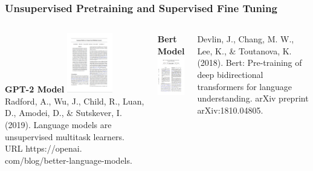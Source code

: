
\begin{frame}
\frametitle{Unsupervised Pretraining and Supervised Fine Tuning}

\begin{columns}
\textbf{GPT-2 Model}
\includegraphics[width=2cm]{images/GPT2-paper}
{\small Radford, A., Wu, J., Child, R., Luan, D., Amodei, D., \& Sutskever, I. (2019). Language models are unsupervised multitask learners. URL https://openai. com/blog/better-language-models.}


\textbf{Bert Model}
\includegraphics[width=2cm]{images/BERT-paper}

{\small Devlin, J., Chang, M. W., Lee, K., \& Toutanova, K. (2018). Bert: Pre-training of deep bidirectional transformers for language understanding. arXiv preprint arXiv:1810.04805.}

\end{columns}

\end{frame}

